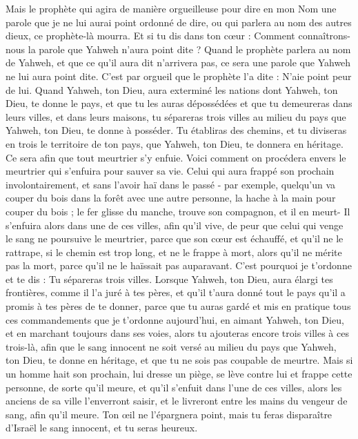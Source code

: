 \begin{multicols}{2}
Mais le prophète qui agira de manière orgueilleuse pour dire en mon Nom une parole que je ne lui aurai point ordonné de dire, ou qui parlera au nom des autres dieux, ce prophète-là mourra.
Et si tu dis dans ton cœur : Comment connaîtrons-nous la parole que Yahweh n'aura point dite ?
Quand le prophète parlera au nom de Yahweh, et que ce qu’il aura dit n’arrivera pas, ce sera une parole que Yahweh ne lui aura point dite. C’est par orgueil que le prophète l'a dite : N’aie point peur de lui.
\VerseOne{}Quand Yahweh, ton Dieu, aura exterminé les nations dont Yahweh, ton Dieu, te donne le pays, et que tu les auras dépossédées et que tu demeureras dans leurs villes, et dans leurs maisons,
tu sépareras trois villes au milieu du pays que Yahweh, ton Dieu, te donne à posséder.
Tu établiras des chemins, et tu diviseras en trois le territoire de ton pays, que Yahweh, ton Dieu, te donnera en héritage. Ce sera afin que tout meurtrier s'y enfuie.
Voici comment on procédera envers le meurtrier qui s’enfuira pour sauver sa vie. Celui qui aura frappé son prochain involontairement, et sans l'avoir haï dans le passé -
par exemple, quelqu'un va couper du bois dans la forêt avec une autre personne, la hache à la main pour couper du bois ; le fer glisse du manche, trouve son compagnon, et il en meurt- Il s'enfuira alors dans une de ces villes, afin qu'il vive,
de peur que celui qui venge le sang ne poursuive le meurtrier, parce que son cœur est échauffé, et qu'il ne le rattrape, si le chemin est trop long, et ne le frappe à mort, alors qu’il ne mérite pas la mort, parce qu'il ne le haïssait pas auparavant.
C'est pourquoi je t’ordonne et te dis : Tu sépareras trois villes.
Lorsque Yahweh, ton Dieu, aura élargi tes frontières, comme il l'a juré à tes pères, et qu'il t’aura donné tout le pays qu'il a promis à tes pères de te donner,
parce que tu auras gardé et mis en pratique tous ces commandements que je t’ordonne aujourd'hui, en aimant Yahweh, ton Dieu, et en marchant toujours dans ses voies, alors tu ajouteras encore trois villes à ces trois-là,
afin que le sang innocent ne soit versé au milieu du pays que Yahweh, ton Dieu, te donne en héritage, et que tu ne sois pas coupable de meurtre.
Mais si un homme hait son prochain, lui dresse un piège, se lève contre lui et frappe cette personne, de sorte qu’il meure, et qu'il s'enfuit dans l'une de ces villes,
alors les anciens de sa ville l’enverront saisir, et le livreront entre les mains du vengeur de sang, afin qu'il meure.
Ton œil ne l'épargnera point, mais tu feras disparaître d’Israël le sang innocent, et tu seras heureux.

\end{multicols}
